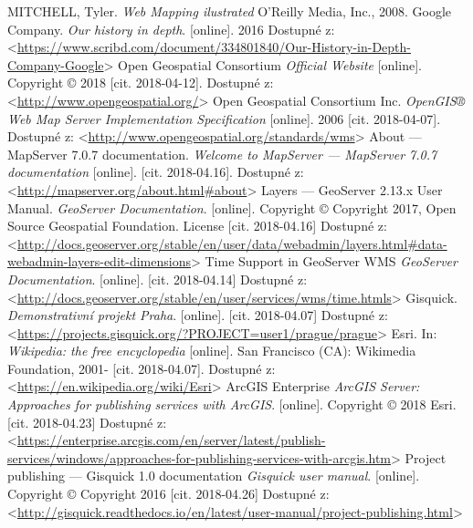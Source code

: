 \documentclass[12pt,a4paper]{article}
\begin{document}
\newpage
\begin{thebibliography}{99}
\label{Bibliography}

MITCHELL, Tyler. \textit{Web Mapping ilustrated} O'Reilly Media, Inc., 2008.
Google Company. \textit{Our history in depth}. [online]. 2016
Dostupné z:\textless\url{https://www.scribd.com/document/334801840/Our-History-in-Depth-Company-Google}\textgreater
{}
Open Geospatial Consortium \textit{Official Website} [online]. Copyright © 2018 [cit. 2018-04-12]. Dostupné z: \textless\url{http://www.opengeospatial.org/}\textgreater
{}
Open Geospatial Consortium Inc. \textit{OpenGIS® Web Map Server Implementation Specification} [online]. 2006 [cit. 2018-04-07].
Dostupné z: \textless\url{http://www.opengeospatial.org/standards/wms}\textgreater
{}
About — MapServer 7.0.7 documentation. \textit{Welcome to MapServer — MapServer 7.0.7 documentation} [online]. [cit. 2018-04.16].
Dostupné z: \textless\url{http://mapserver.org/about.html#about}\textgreater
{}
Layers — GeoServer 2.13.x User Manual. \textit{GeoServer Documentation}. [online]. Copyright © Copyright 2017, Open Source Geospatial Foundation. License [cit. 2018-04.16]
Dostupné z: \textless\url{http://docs.geoserver.org/stable/en/user/data/webadmin/layers.html#data-webadmin-layers-edit-dimensions}\textgreater
{}
Time Support in GeoServer WMS \textit{GeoServer Documentation}. [online].
[cit. 2018-04.14]
Dostupné z: \textless\url{http://docs.geoserver.org/stable/en/user/services/wms/time.htmls}\textgreater
{}
Gisquick. \textit{Demonstrativní projekt Praha}. [online].
[cit. 2018-04.07]
Dostupné z: \textless\url{https://projects.gisquick.org/?PROJECT=user1/prague/prague}\textgreater
{}
Esri. In: \textit{Wikipedia: the free encyclopedia} [online]. San Francisco (CA): Wikimedia Foundation, 2001- 
[cit. 2018-04.07]. Dostupné z: \textless\url{https://en.wikipedia.org/wiki/Esri}\textgreater
{}
ArcGIS Enterprise \textit{ArcGIS Server: Approaches for publishing services with ArcGIS}. [online]. Copyright © 2018 Esri.
[cit. 2018-04.23]
Dostupné z:
\textless\url{https://enterprise.arcgis.com/en/server/latest/publish-services/windows/approaches-for-publishing-services-with-arcgis.htm}\textgreater
{}
Project publishing — Gisquick 1.0 documentation \textit{Gisquick user manual}. [online].
Copyright © Copyright 2016
[cit. 2018-04.26]
Dostupné z: \textless\url{http://gisquick.readthedocs.io/en/latest/user-manual/project-publishing.html}\textgreater

\end{thebibliography}
\end{document}
